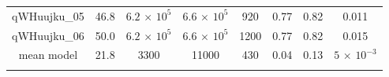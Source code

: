 \begin{table}
\begin{threeparttable}
\begin{tabular}{cccccccc}
qWHuujku\_{05} &46.8&$6.2\,{\times}\,10^5$ &$6.6\,{\times}\,10^5$ & 920 & 0.77 & 0.82& 0.011\\ 
qWHuujku\_{06} &50.0 &$6.2\,{\times}\,10^5$ &$6.6\,{\times}\,10^5$ & 1200 & 0.77 & 0.82 & 0.015\\ 
\noalign{\smallskip}
\hline
mean model & 21.8 & 3300 & 11000 & 430 & 0.04 & 0.13 & $5\,{\times}\,10^{-3}$\\
\noalign{\smallskip}
\hline
\end{tabular}
\end{threeparttable}
\end{table}

